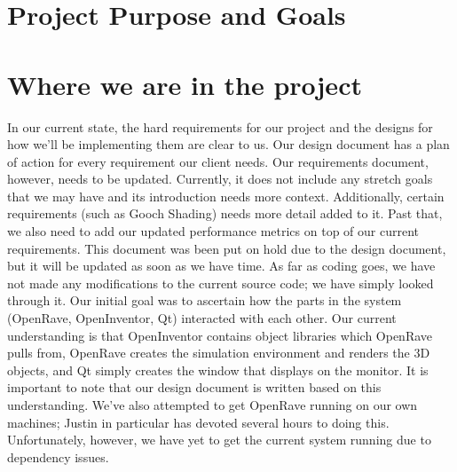 \documentclass[10pt,journal,compsoc,draftclsnofoot]{IEEEtran}
\begin{document}
\begin{flushleft}

\section{Project Purpose and Goals}


\section{Where we are in the project}
In our current state, the hard requirements for our project and the designs for how we'll be implementing them are clear to us.
Our design document has a plan of action for every requirement our client needs.
Our requirements document, however, needs to be updated.
Currently, it does not include any stretch goals that we may have and its introduction needs more context.
Additionally, certain requirements (such as Gooch Shading) needs more detail added to it.
Past that, we also need to add our updated performance metrics on top of our current requirements.
This document was been put on hold due to the design document, but it will be updated as soon as we have time.
As far as coding goes, we have not made any modifications to the current source code; we have simply looked through it.
Our initial goal was to ascertain how the parts in the system (OpenRave, OpenInventor, Qt) interacted with each other.
Our current understanding is that OpenInventor contains object libraries which OpenRave pulls from, OpenRave creates the simulation environment and renders the 3D objects, and Qt simply creates the window that displays on the monitor.
It is important to note that our design document is written based on this understanding.
We've also attempted to get OpenRave running on our own machines; Justin in particular has devoted several hours to doing this.
Unfortunately, however, we have yet to get the current system running due to dependency issues.


\end{flushleft}
\end{document}
